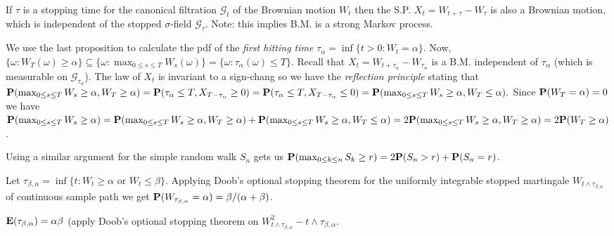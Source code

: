 \begin{proposition*}
If $\tau$ is a stopping time for the canonical filtration $\mathcal G_t$ of the Brownian motion $W_t$ then the S.P. $X_t = W_{t + \tau} - W_\tau$ is also a Brownian motion, which is independent of the stopped $\sigma$-field $\mathcal G_\tau$. Note: this implies B.M. is a strong Markov process.
\end{proposition*}

\begin{remark*}
We use the last proposition to calculate the pdf of the \emph{first hitting time} $\tau_\alpha = \inf\{t > 0: W_t = \alpha\}$. Now, $\{\omega : W_T(\omega) \geq \alpha\} \subseteq \{\omega : \max_{0\leq s \leq T} W_s(\omega)\} = \{\omega : \tau_\alpha(\omega) \leq T\}$. Recall that $X_t = W_{t+\tau_\alpha} - W_{\tau_\alpha}$ is a B.M. independent of $\tau_\alpha$ (which is measurable on $\mathcal G_{\tau_\alpha}$). The law of $X_t$ is invariant to a sign-chang so we have the \emph{reflection principle} stating that $\mathbf{P}(\max_{0\leq s\leq T} W_s\geq\alpha,W_T\geq\alpha) = \mathbf{P}(\tau_\alpha\leq T, X_{T-\tau_\alpha} \geq0) = \mathbf{P}(\tau_\alpha \leq T, X_{T-\tau_\alpha} \leq 0) = \mathbf{P} (\max_{0\leq s \leq T} W_s \geq \alpha, W_T \leq \alpha).$ Since $\mathbf{P}(W_T=\alpha)=0$ we have $\mathbf{P}(\max_{0\leq s \leq T} W_s \geq \alpha) = \mathbf{P}(\max_{0\leq s \leq T} W_s \geq \alpha, W_T \geq \alpha) + \mathbf{P}(\max_{0\leq s \leq T} W_s \geq \alpha, W_T \leq \alpha) = 2\mathbf{P}(\max_{0\leq s \leq T} W_s \geq \alpha, W_T \geq \alpha) = 2\mathbf{P}(W_T\geq \alpha)$.
\end{remark*}

\begin{remark*}
Using a similar argument for the simple random walk $S_n$ gets us $\mathbf{P}(\max_{0\leq k\leq n} S_k \geq r) = 2\mathbf{P}(S_n > r) + \mathbf{P}(S_n=r)$.
\end{remark*}

\begin{remark*}
Let $\tau_{\beta,\alpha} = \inf\{t : W_t\geq \alpha\text{ or } W_t\leq\beta\}$. Applying Doob's optional stopping theorem for the uniformly integrable stopped martingale $W_{t\wedge \tau_{\beta,\alpha}}$ of continuous sample path we get $\mathbf{P}(W_{\tau_{\beta,\alpha}} = \alpha) = \beta/(\alpha+\beta)$.
\end{remark*}

\begin{exercise*}
$\mathbf{E}(\tau_{\beta,\alpha})=\alpha\beta$ (apply Doob's optional stopping theorem on $W^2_{t\wedge\tau_{\beta,\alpha}}-t\wedge\tau_{\beta,\alpha}$.
\end{exercise*}

